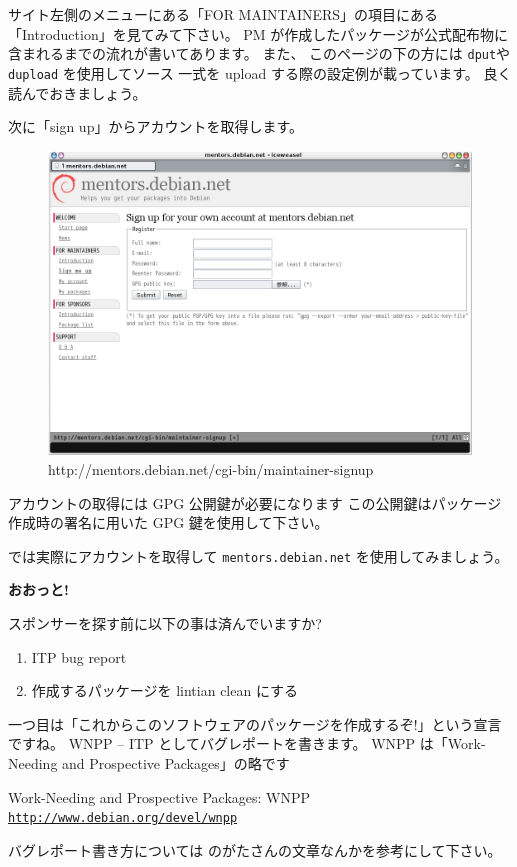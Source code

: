 \documentclass[mingoth,a4paper]{jsarticle}
\begin{document}
サイト左側のメニューにある「FOR MAINTAINERS」の項目にある 
「Introduction」を見てみて下さい。 
%
PM が作成したパッケージが公式配布物に含まれるまでの流れが書いてあります。
%
また、 このページの下の方には {\tt dput}や{\tt dupload} を使用してソース
一式を upload する際の設定例が載っています。
良く読んでおきましょう。

次に「sign up」からアカウントを取得します。
\begin{figure}[h]
    \begin{center}
        \includegraphics[scale=0.6]{image200909/mentors-signup.png}
        \caption[mentors-signup]{%
          http://mentors.debian.net/cgi-bin/maintainer-signup}
    \end{center}
\end{figure}

アカウントの取得には GPG 公開鍵が必要になります
この公開鍵はパッケージ作成時の署名に用いた GPG 鍵を使用して下さい。

では実際にアカウントを取得して {\tt mentors.debian.net} を使用してみましょう。

\begin{center}
{\bf おおっと!}    
\end{center}
スポンサーを探す前に以下の事は済んでいますか?
\begin{enumerate}
      \item ITP bug report
      \item 作成するパッケージを lintian clean にする
\end{enumerate}


一つ目は「これからこのソフトウェアのパッケージを作成するぞ!」という宣言ですね。
WNPP -- ITP としてバグレポートを書きます。 
WNPP は「Work-Needing and Prospective Packages」の略です
\begin{center}
    Work-Needing and Prospective Packages: WNPP\\
    \href{http://www.debian.org/devel/wnpp}%
    {{\tt http://www.debian.org/devel/wnpp}}
\end{center}
バグレポート書き方については
のがたさんの文章なんかを参考にして下さい。
\end{document}
